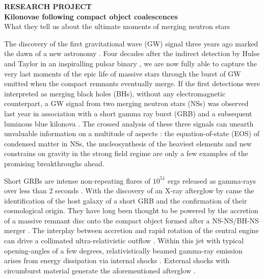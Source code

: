 \documentclass[12pt,onecolumn]{article}
\makeatletter
\newcommand{\gw}{GW\xspace}
\newcommand{\grb}{GRB\xspace}
\newcommand{\grbs}{GRBs\xspace}
\newcommand{\eos}{EOS\xspace}
\newcommand*{\ns}{NS\@\xspace}
\newcommand*{\nss}{NSs\@\xspace}
\newcommand*{\bh}{BH\@\xspace}
\newcommand*{\bhs}{BHs\@\xspace}
\makeatother
\begin{document}
\newpage

\vspace*{-1.2cm}
\begin{center}
\Large \textbf{RESEARCH PROJECT}\\
\vspace*{0.2cm}
\large \textbf{Kilonovae following compact object coalescences}\\
What they tell us about the ultimate moments of merging neutron stars  
\end{center}
\normalfont

The discovery of the first gravitational wave (\gw) signal three years ago marked the dawn of a new astronomy \citep{Abbott2016}. Four decades after the indirect detection by Hulse and Taylor in an inspiralling pulsar binary \citep{Hulse1974}, we are now fully able to capture the very last moments of the epic life of massive stars through the burst of \gw emitted when the compact remnants eventually merge. If the first detections were interpreted as merging black holes (\bhs), without any electromagnetic counterpart, a \gw signal from two merging neutron stars (\nss) was observed last year in association with a short gamma ray burst (\grb) and a subsequent luminous blue kilonova \citep{TheLIGOScientificCollaboration2017}. The crossed analysis of these three signals can unearth unvaluable information on a multitude of aspects : the equation-of-state (\eos) of condensed matter in \nss, the nucleosynthesis of the heaviest elements and new constrains on gravity in the strong field regime are only a few examples of the promising breakthroughs ahead.

Short \grbs are intense non-repeating flares of $10^{51}$ ergs released as gamma-rays over less than 2 seconds \citep{Berger2014}. With the discovery of an X-ray afterglow by \citet{Gehrels2005} came the identification of the host galaxy of a short \grb and the confirmation of their cosmological origin. They have long been thought to be powered by the accretion of a massive remnant disc onto the compact object formed after a \ns-\ns/\bh-\ns merger \citep{Eichler1989}. The interplay between accretion and rapid rotation of the central engine can drive a collimated ultra-relativistic outflow \citep{Piran2005}. Within this jet with typical opening-angles of a few degrees, relativistically beamed gamma-ray emission arises from energy dissipation via internal shocks \citep{Rees1992}. External shocks with circumburst material generate the aforementioned afterglow \citep{Kumar2015}.
\end{document}
